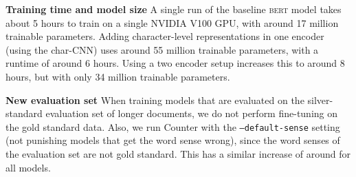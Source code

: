 \documentclass[11pt,a4paper]{article}
\newcommand{\bert}{\textsc{bert}}
\newcommand{\inlineheader}[1]{\vspace{0.06cm}
\noindent\textbf{#1}\quad
}
\begin{document}
\inlineheader{Training time and model size} A single run of the baseline \bert{} model takes about 5 hours to train on a single NVIDIA V100 GPU, with around 17 million trainable parameters. Adding character-level representations in one encoder (using the char-CNN) uses around 55 million trainable parameters, with a runtime of around 6 hours. Using a two encoder setup increases this to around 8 hours, but with only 34 million trainable parameters.

\inlineheader{New evaluation set} When training models that are evaluated on the silver-standard evaluation set of longer documents, we do not perform fine-tuning on the gold standard data. Also, we run Counter with the \texttt{--default-sense} setting (not punishing models that get the word sense wrong), since the word senses of the evaluation set are not gold standard. This has a similar increase of around  for all models.
\end{document}
